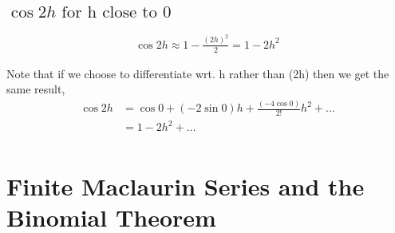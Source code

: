 \documentclass[MathsNotesBase.tex]{subfiles}
\begin{document}
	
	\subsection*{$\cos{2h} \text{ for h close to }0$}
	
	\begin{align*}
	\cos{2h} \approx 1 - \frac{(2h)^2}{2} = 1 - 2h^2
	\end{align*}
	
	Note that if we choose to differentiate wrt. h rather than (2h) then we get the same result,
	\begin{align*}
	\cos{2h} &= \cos{0} + (-2\sin{0})h + \frac{(-4\cos{0})}{2!}h^2 + \ldots \\
		&= 1 - 2h^2 + \ldots \\
	\end{align*}
	

\bigskip		
\section*{Finite Maclaurin Series and the Binomial Theorem}
\bigskip
\end{document}
